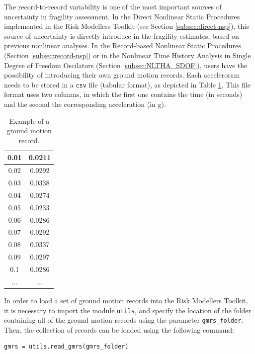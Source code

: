 The record-to-record variability is one of the most important sources of uncertainty in fragility assessment. In the Direct Nonlinear Static Procedures implemented in the Risk Modellers Toolkit (see Section \ref{subsec:direct-nsp}), this source of uncertainty is directly introduce in the fragility estimates, based on previous nonlinear analyses. In the Record-based Nonlinear Static Procedures (Section \ref{subsec:record-nsp}) or in the Nonlinear Time History Analysis in Single Degree of Freedom Oscilators (Section \ref{subsec:NLTHA_SDOF}), users have the possibility of introducing their own ground motion records. Each acceleroram needs to be stored in a \verb=csv= file (tabular format), as depicted in Table \ref{table:gmr}. This file format uses two columns, in which the first one contains the time (in seconds) and the second the corresponding acceleration (in g). \\

\begin {table}[htb]
\caption{Example of a ground motion record.} 
\label{table:gmr} 
\begin{center}
  \begin{tabular}{ | c | c |}
  \hline
0.01 & 0.0211 \\ \hline
0.02 & 0.0292 \\ \hline
0.03 & 0.0338 \\ \hline
0.04 & 0.0274 \\ \hline
0.05 & 0.0233 \\ \hline
0.06 & 0.0286 \\ \hline
0.07 & 0.0292 \\ \hline
0.08 & 0.0337 \\ \hline
0.09 & 0.0297 \\ \hline
0.1 & 0.0286 \\ \hline
... & ...  \\ \hline
  \end{tabular}
\end{center}
\end{table}

In order to load a set of ground motion records into the Risk Modellers Toolkit, it is necessary to import the module \verb=utils=, and specify the location of the folder containing all of the ground motion records using the parameter \verb=gmrs_folder=. Then, the collection of records can be loaded using the following command:

\begin{Verbatim}[frame=single, commandchars=\\\{\}, samepage=true]
gmrs = utils.read_gmrs(gmrs_folder)
\end{Verbatim}

